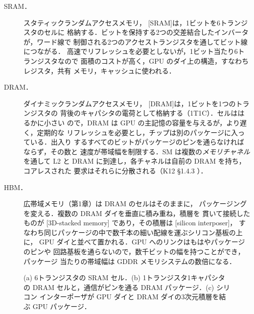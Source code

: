 \documentclass[../main.tex]{subfiles}
\begin{document}
\begin{description}
  \item[SRAM．] スタティックランダムアクセスメモリ，
    [SRAM]は，1ビットを6トランジスタのセルに
    格納する．ビットを保持する2つの交差結合したインバータが，ワード線で
    制御される2つのアクセストランジスタを通してビット線につながる．
    高速でリフレッシュを必要としないが，1ビット当たり6トランジスタなので
    面積のコストが高く，GPU のダイ上の構造，すなわちレジスタ，共有
    メモリ，キャッシュに使われる．
  \item[DRAM．] ダイナミックランダムアクセスメモリ，
    [DRAM]は，1ビットを1つのトランジスタの
    背後のキャパシタの電荷として格納する（1T1C）．セルははるかに小さい
    ので，DRAM は GPU の主記憶の容量を与えるが，より遅く，定期的な
    リフレッシュを必要とし，チップは別のパッケージに入っている．出入り
    するすべてのビットがパッケージのピンを通らなければならず，その数と
    速度が帯域幅を制限する．SM は複数の\emph{メモリチャネル}を通して
    L2 と DRAM に到達し，各チャネルは自前の DRAM を持ち，コアレスされた
    要求はそれらに分散される（K12 §1.4.3 \cite{kim2012gpgpu}）．
  \item[HBM．] 広帯域メモリ（第1章）は DRAM のセルはそのままに，
    パッケージングを変える．複数の DRAM ダイを垂直に積み重ね，積層を
    貫いて接続したものが
    [3D-stacked memory]
    であり，その積層は
    [silicon interposer]，
    すなわち同じパッケージの中で数千本の細い配線を運ぶシリコン基板の上に，
    GPU ダイと並べて置かれる．GPU へのリンクはもはやパッケージのピンや
    回路基板を通らないので，数千ビットの幅を持つことができ，パッケージ
    当たりの帯域幅は GDDR メモリシステムの数倍になる．
\end{description}

\begin{figure}[htbp]
  \centering
  
  \caption{(a) 6トランジスタの SRAM セル．(b) 1トランジスタ1キャパシタの
    DRAM セルと，通信がピンを通る DRAM パッケージ．(c) シリコン
    インターポーザが GPU ダイと DRAM ダイの3次元積層を結ぶ GPU
    パッケージ．}
  \label{fig:l04-sram-dram-hbm}
\end{figure}
\end{document}

